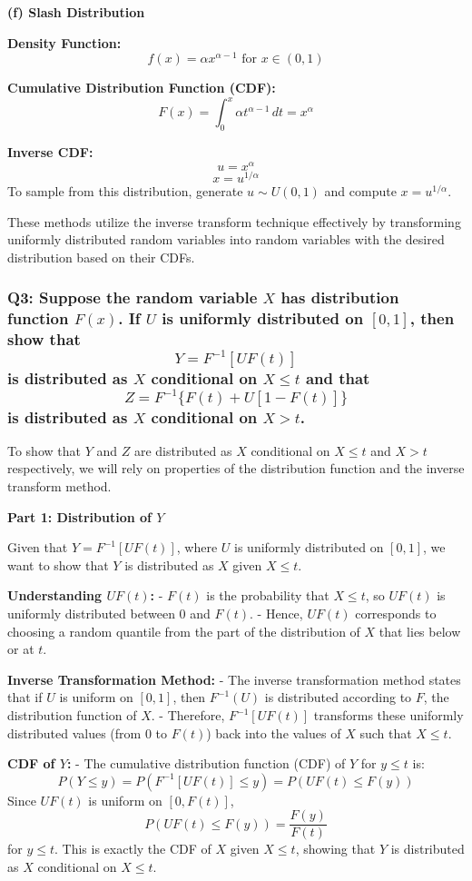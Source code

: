 \documentclass[8pt]{article}
\begin{document}
\textbf{(f) Slash Distribution}

\textbf{Density Function:}
\[
f(x) = \alpha x^{\alpha-1} \text{ for } x \in (0, 1)
\]

\textbf{Cumulative Distribution Function (CDF):}
\[
F(x) = \int_0^x \alpha t^{\alpha-1} \, dt = x^\alpha
\]

\textbf{Inverse CDF:}
\[
u = x^\alpha
\]
\[
x = u^{1/\alpha}
\]
To sample from this distribution, generate \( u \sim U(0, 1) \) and compute \( x = u^{1/\alpha} \).

These methods utilize the inverse transform technique effectively by transforming uniformly distributed random variables into random variables with the desired distribution based on their CDFs.

\subsubsection*{Q3:
Suppose the random variable \(X\) has distribution function \(F(x)\). If \(U\) is uniformly distributed on \([0, 1]\), then show that
\[
Y = F^{-1}[UF(t)]
\]
is distributed as \(X\) conditional on \(X \leq t\) and that
\[
Z = F^{-1}\{F(t) + U[1 - F(t)]\}
\]
is distributed as \(X\) conditional on \(X > t\).}

To show that \(Y\) and \(Z\) are distributed as \(X\) conditional on \(X \leq t\) and \(X > t\) respectively, we will rely on properties of the distribution function and the inverse transform method.

\textbf{Part 1: Distribution of \(Y\)}

Given that \(Y = F^{-1}[UF(t)]\), where \(U\) is uniformly distributed on \([0, 1]\), we want to show that \(Y\) is distributed as \(X\) given \(X \leq t\).

\textbf{Understanding \(UF(t)\):}
- \(F(t)\) is the probability that \(X \leq t\), so \(UF(t)\) is uniformly distributed between 0 and \(F(t)\).
- Hence, \(UF(t)\) corresponds to choosing a random quantile from the part of the distribution of \(X\) that lies below or at \(t\).

\textbf{Inverse Transformation Method:}
- The inverse transformation method states that if \(U\) is uniform on \([0, 1]\), then \(F^{-1}(U)\) is distributed according to \(F\), the distribution function of \(X\).
- Therefore, \(F^{-1}[UF(t)]\) transforms these uniformly distributed values (from 0 to \(F(t)\)) back into the values of \(X\) such that \(X \leq t\). 

\textbf{CDF of \(Y\):}
- The cumulative distribution function (CDF) of \(Y\) for \(y \leq t\) is:
  \[
  P(Y \leq y) = P(F^{-1}[UF(t)] \leq y) = P(UF(t) \leq F(y))
  \]
  Since \(UF(t)\) is uniform on \([0, F(t)]\),
  \[
  P(UF(t) \leq F(y)) = \frac{F(y)}{F(t)}
  \]
  for \(y \leq t\). This is exactly the CDF of \(X\) given \(X \leq t\), showing that \(Y\) is distributed as \(X\) conditional on \(X \leq t\).
\end{document}

